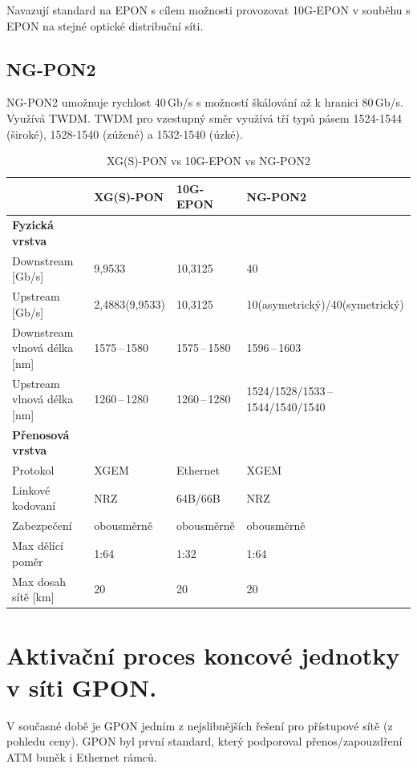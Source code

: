 Navazují standard na EPON s cílem možnosti provozovat 10G-EPON v souběhu s EPON na stejné optické distribuční síti.

\subsection{NG-PON2}

NG-PON2 umožnuje rychlost 40\,Gb/s s možností škálování až k hranici 80\,Gb/s. Využívá TWDM. TWDM pro vzestupný směr využívá tří typů pásem 1524-1544 (široké), 1528-1540 (zúžené) a 1532-1540 (úzké).

\begin{table}[ht]
    \centering
    \caption{XG(S)-PON vs 10G-EPON vs NG-PON2}
    \begin{tabular}{|l|l|l|l|}
        \hline
        & XG(S)-PON & 10G-EPON & NG-PON2 \\\hline\hline
        \textbf{Fyzická vrstva} & & & \\\hline\hline
        Downstream [Gb/s] & 9,9533 & 10,3125 & 40 \\\hline
        Upstream [Gb/s] & 2,4883(9,9533) & 10,3125 & 10(asymetrický)/40(symetrický) \\\hline
        Downstream vlnová délka [nm] & 1575\,--\,1580 & 1575\,--\,1580 & 1596\,--\,1603 \\\hline
        Upstream vlnová délka [nm] & 1260\,--\,1280 & 1260\,--\,1280 & 1524/1528/1533\,--\,1544/1540/1540 \\\hline\hline
        \textbf{Přenosová vrstva} & & & \\\hline\hline
        Protokol & XGEM & Ethernet & XGEM \\\hline
        Linkové kodovaní & NRZ & 64B/66B & NRZ \\\hline
        Zabezpečení & obousměrně & obousměrně & obousměrně \\\hline
        Max dělící poměr & 1:64 & 1:32 & 1:64\\\hline
        Max dosah sítě [km] & 20 & 20 & 20 \\\hline
    \end{tabular}
\end{table}

\clearpage
\section{Aktivační proces koncové jednotky v síti GPON.}
V současné době je GPON jedním z nejslibnějších řešení pro přístupové sítě (z pohledu ceny). GPON byl první standard, který podporoval přenos/zapouzdření ATM buněk i Ethernet rámců. 

